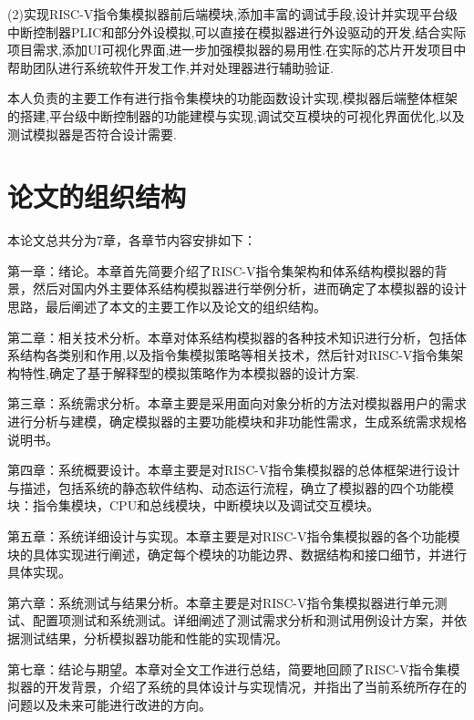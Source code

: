(2)实现RISC-V指令集模拟器前后端模块,添加丰富的调试手段,设计并实现平台级中断控制器PLIC和部分外设模拟,可以直接在模拟器进行外设驱动的开发,结合实际项目需求,添加UI可视化界面,进一步加强模拟器的易用性.在实际的芯片开发项目中帮助团队进行系统软件开发工作,并对处理器进行辅助验证.


本人负责的主要工作有进行指令集模块的功能函数设计实现,模拟器后端整体框架的搭建,平台级中断控制器的功能建模与实现,调试交互模块的可视化界面优化,以及测试模拟器是否符合设计需要.


\section{论文的组织结构}
本论文总共分为7章，各章节内容安排如下：


第一章：绪论。本章首先简要介绍了RISC-V指令集架构和体系结构模拟器的背景，然后对国内外主要体系结构模拟器进行举例分析，进而确定了本模拟器的设计思路，最后阐述了本文的主要工作以及论文的组织结构。


第二章：相关技术分析。本章对体系结构模拟器的各种技术知识进行分析，包括体系结构各类别和作用,以及指令集模拟策略等相关技术，然后针对RISC-V指令集架构特性,确定了基于解释型的模拟策略作为本模拟器的设计方案.


第三章：系统需求分析。本章主要是采用面向对象分析的方法对模拟器用户的需求进行分析与建模，确定模拟器的主要功能模块和非功能性需求，生成系统需求规格说明书。


第四章：系统概要设计。本章主要是对RISC-V指令集模拟器的总体框架进行设计与描述，包括系统的静态软件结构、动态运行流程，确立了模拟器的四个功能模块：指令集模块，CPU和总线模块，中断模块以及调试交互模块。


第五章：系统详细设计与实现。本章主要是对RISC-V指令集模拟器的各个功能模块的具体实现进行阐述，确定每个模块的功能边界、数据结构和接口细节，并进行具体实现。


第六章：系统测试与结果分析。本章主要是对RISC-V指令集模拟器进行单元测试、配置项测试和系统测试。详细阐述了测试需求分析和测试用例设计方案，并依据测试结果，分析模拟器功能和性能的实现情况。


第七章：结论与期望。本章对全文工作进行总结，简要地回顾了RISC-V指令集模拟器的开发背景，介绍了系统的具体设计与实现情况，并指出了当前系统所存在的问题以及未来可能进行改进的方向。


